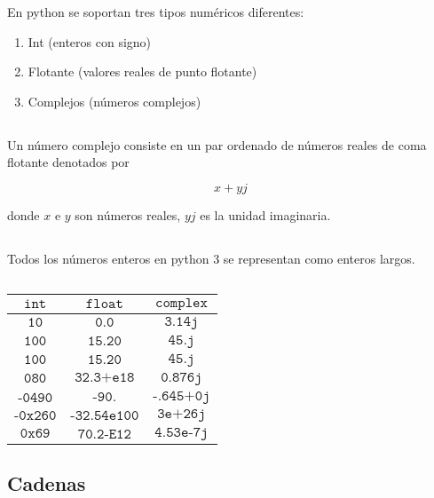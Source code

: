 \documentclass[]{article}
\providecommand{\tightlist}{%
  \setlength{\itemsep}{0pt}\setlength{\parskip}{0pt}}
\begin{document}
En python se soportan tres tipos numéricos diferentes:

\begin{enumerate}
\def\labelenumi{\arabic{enumi}.}
\tightlist
\item
  Int (enteros con signo)
\item
  Flotante (valores reales de punto flotante)
\item
  Complejos (números complejos)
\end{enumerate}

\subsection{}\label{section-21}

Un número complejo consiste en un par ordenado de números reales de coma
flotante denotados por

\[x + yj\]

donde \(x\) e \(y\) son números reales, \(yj\) es la unidad imaginaria.

\subsection{}\label{section-22}

Todos los números enteros en python 3 se representan como enteros
largos.

\subsection{}\label{section-23}

\begin{longtable}[]{@{}ccc@{}}
\toprule
\(\texttt{int}\) & \(\texttt{float}\) &
\(\texttt{complex}\)\tabularnewline
\midrule
\endhead
\(\texttt{10}\) & \(\texttt{0.0}\) & \(\texttt{3.14j}\)\tabularnewline
\(\texttt{100}\) & \(\texttt{15.20}\) & \(\texttt{45.j}\)\tabularnewline
\(\texttt{100}\) & \(\texttt{15.20}\) & \(\texttt{45.j}\)\tabularnewline
\(\texttt{080}\) & \(\texttt{32.3+e18}\) &
\(\texttt{0.876j}\)\tabularnewline
\(\texttt{-0490}\) & \(\texttt{-90.}\) &
\(\texttt{-.645+0j}\)\tabularnewline
\(\texttt{-0x260}\) & \(\texttt{-32.54e100}\) &
\(\texttt{3e+26j}\)\tabularnewline
\(\texttt{0x69}\) & \(\texttt{70.2-E12}\) &
\(\texttt{4.53e-7j}\)\tabularnewline
\bottomrule
\end{longtable}

\subsection{Cadenas}\label{cadenas}
\end{document}
